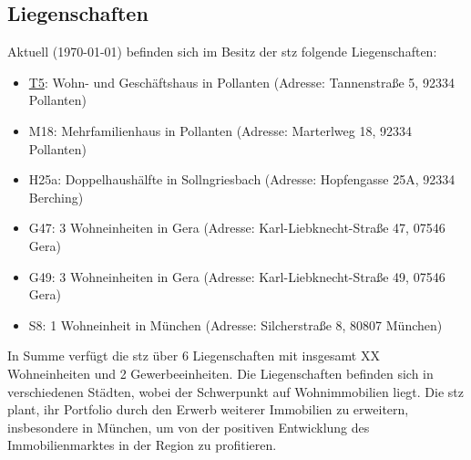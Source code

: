\subsection{Liegenschaften}\label{subsec:Liegenschaften}

\par Aktuell (\today) befinden sich im Besitz der \gls{stz} folgende Liegenschaften:

\begin{itemize}
    \item \hyperref[subsec:Tannenstrasse5]{T5}:  Wohn- und Geschäftshaus in Pollanten  (Adresse: Tannenstraße 5, 92334 Pollanten)
    \item M18: Mehrfamilienhaus in Pollanten (Adresse: Marterlweg 18, 92334 Pollanten)
    \item H25a: Doppelhaushälfte in Sollngriesbach (Adresse: Hopfengasse 25A, 92334 Berching)
    \item G47: 3 Wohneinheiten in Gera (Adresse: Karl-Liebknecht-Straße 47, 07546 Gera)
    \item G49: 3 Wohneinheiten in Gera (Adresse: Karl-Liebknecht-Straße 49, 07546 Gera)
    \item S8: 1 Wohneinheit in München (Adresse: Silcherstraße 8, 80807 München)    
\end{itemize}

\par In Summe verfügt die \gls{stz} über 6 Liegenschaften mit insgesamt XX Wohneinheiten und 2 Gewerbeeinheiten. Die Liegenschaften befinden sich in verschiedenen Städten, wobei der Schwerpunkt auf Wohnimmobilien liegt. Die \gls{stz} plant, ihr Portfolio durch den Erwerb weiterer Immobilien zu erweitern, insbesondere in München, um von der positiven Entwicklung des Immobilienmarktes in der Region zu profitieren.